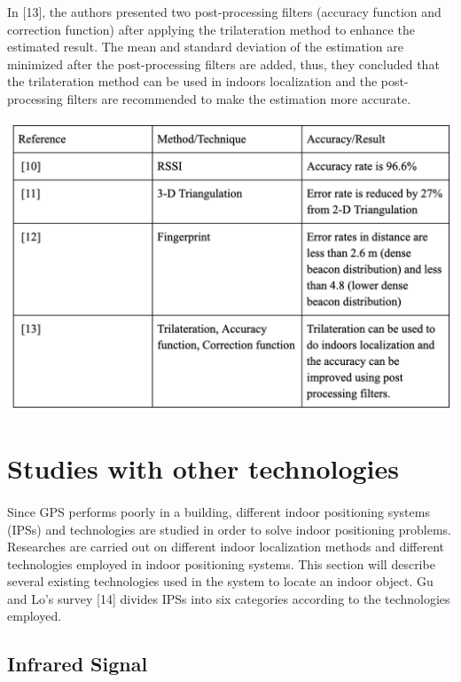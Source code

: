 In [13], the authors presented two post-processing filters (accuracy function and correction function) after applying the trilateration method to enhance the estimated result. The mean and standard deviation of the estimation are minimized after the post-processing filters are added, thus, they concluded that the trilateration method can be used in indoors localization and the post-processing filters are recommended to make the estimation more accurate.

\includegraphics[scale = 0.6]{Image/tableofrelated.png}


\section{Studies with other technologies}
\paragraph{} Since GPS performs poorly in a building, different indoor positioning systems (IPSs) and technologies are studied in order to solve indoor positioning problems. Researches are carried out on different indoor localization methods and different technologies employed in indoor positioning systems. This section will describe several existing technologies used in the system to locate an indoor object. Gu and Lo’s survey [14] divides IPSs into six categories according to the technologies employed.

\subsection{Infrared Signal}
